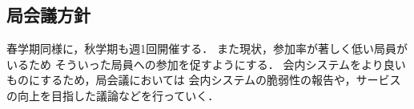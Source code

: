 \subsection*{局会議方針}

春学期同様に，秋学期も週1回開催する．
また現状，参加率が著しく低い局員がいるため
そういった局員への参加を促すようにする．
会内システムをより良いものにするため，局会議においては
会内システムの脆弱性の報告や，サービスの向上を目指した議論などを行っていく．
